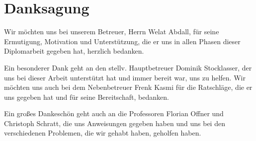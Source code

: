 \chapter*{Danksagung}

Wir möchten uns bei unserem Betreuer, Herrn Welat Abdall, für seine Ermutigung, Motivation und Unterst\"utzung, die er uns in allen Phasen dieser Diplomarbeit gegeben hat, herzlich bedanken. 

Ein besonderer Dank geht an den stellv. Hauptbetreuer Dominik Stocklasser, der uns bei dieser Arbeit unterstützt hat und immer bereit war, uns zu helfen. Wir möchten uns auch bei dem Nebenbetreuer Frenk Kasmi f\"ur die Ratschl\"age, die er uns gegeben hat und für seine Bereitschaft, bedanken.  

Ein großes Dankeschön geht auch an die Professoren Florian Offner und Christoph Schratt, die uns Anweisungen gegeben haben und uns bei den verschiedenen Problemen, die wir gehabt haben, geholfen haben.